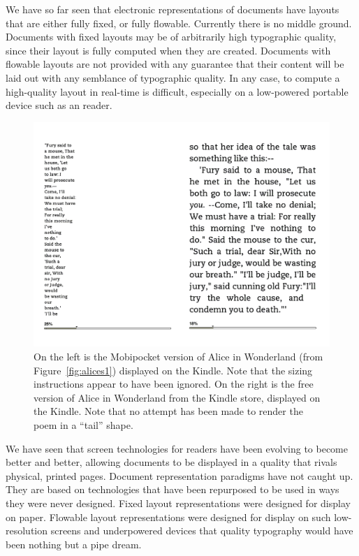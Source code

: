 We have so far seen that electronic representations of documents have layouts that are either fully fixed, or fully flowable. Currently there is no middle ground. Documents with fixed layouts may be of arbitrarily high typographic quality, since their layout is fully computed when they are created. Documents with flowable layouts are not provided with any guarantee that their content will be laid out with any semblance of typographic quality. In any case, to compute a high-quality layout in real-time is difficult, especially on a low-powered portable device such as an \ebook{} reader.

\begin{figure}
\includegraphics[width=\textwidth]{gfx/alices2}
\vspace{-0.2in}
\caption[Same document displayed on the Kindle]{On the left is the Mobipocket version of Alice in Wonderland (from Figure~\ref{fig:alices1}) displayed on the Kindle. Note that the sizing instructions appear to have been ignored. On the right is the free version of Alice in Wonderland from the Kindle store, displayed on the Kindle. Note that no attempt has been made to render the poem in a ``tail'' shape.}
\label{fig:alices2}
\end{figure}

We have seen that screen technologies for \ebook{} readers have been evolving to become better and better, allowing documents to be displayed in a quality that rivals physical, printed pages. Document representation paradigms have not caught up. They are based on technologies that have been repurposed to be used in ways they were never designed. Fixed layout representations were designed for display on paper. Flowable layout representations were designed for display on such low-resolution screens and underpowered devices that quality typography would have been nothing but a pipe dream.


